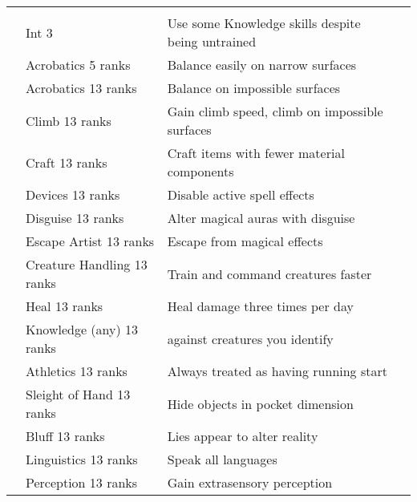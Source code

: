 {\begin{longtabu}{>{\lcol}p{10em} >{\lcol}p{15em} >{\lcol}X >{\lcol}p{3em}}
    \midrule
     &  &  &  \\
     & Int 3 & Use some Knowledge skills despite being untrained &  \\
     & Acrobatics 5 ranks & Balance easily on narrow surfaces &  \\
     & Acrobatics 13 ranks & Balance on impossible surfaces &  \\
     & Climb 13 ranks & Gain climb speed, climb on impossible surfaces &  \\
     & Craft 13 ranks & Craft items with fewer material components &  \\
     & Devices 13 ranks & Disable active spell effects &  \\
     & Disguise 13 ranks & Alter magical auras with disguise &  \\
     & Escape Artist 13 ranks & Escape from magical effects &  \\
     & Creature Handling 13 ranks & Train and command creatures faster &  \\
     & Heal 13 ranks & Heal damage three times per day &  \\
     & Knowledge (any) 13 ranks &  against creatures you identify &  \\
     & Athletics 13 ranks & Always treated as having running start &  \\
     & Sleight of Hand 13 ranks & Hide objects in pocket dimension &  \\
     & Bluff 13 ranks & Lies appear to alter reality &  \\
     & Linguistics 13 ranks & Speak all languages &  \\
     & Perception 13 ranks & Gain extrasensory perception &  \\

\end{longtabu}}
